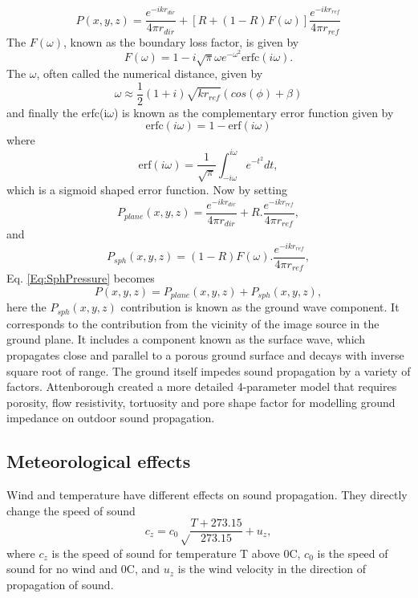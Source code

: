 \begin{equation}
    P(x,y,z)=\frac{e^{-ikr_{dir}}}{4\pi r_{dir}} + [R + (1-R)F(\omega)]\frac{e^{-ikr_{ref}}}{4\pi r_{ref}}
    \label{Eq:SphPressure}
\end{equation}
The $F(\omega)$, known as the boundary loss factor, is given by
\begin{equation}
    F(\omega)=1-i\sqrt{\pi}\omega e^{-\omega^2}\text{erfc}(i\omega).
\end{equation}
The $\omega$, often called the numerical distance, given by
\begin{equation}
    \omega \approx \frac{1}{2}(1+i)\sqrt{kr_{ref}}(cos(\phi)+\beta)
\end{equation}
and finally the erfc(i$\omega$) is known as the complementary error function given by 
\begin{equation}
    \text{erfc}(i\omega) = 1-\text{erf}(i\omega)
\end{equation}
where
\begin{equation}
    \text{erf}(i\omega)=\frac{1}{\sqrt\pi}\int_{-i\omega}^{i\omega}e^{-t^2}dt,
\end{equation}
which is a sigmoid shaped error function. Now by setting
\begin{equation}
    P_{plane}(x,y,z)=\frac{e^{-ikr_{dir}}}{4\pi r_{dir}} + R.\frac{e^{-ikr_{ref}}}{4\pi r_{ref}},
\end{equation}
and 
\begin{equation}
    P_{sph}(x,y,z)=(1-R)F(\omega).\frac{e^{-ikr_{ref}}}{4\pi r_{ref}},
\end{equation}
Eq. \ref{Eq:SphPressure} becomes
\begin{equation}
    P(x,y,z)=P_{plane}(x,y,z) + P_{sph}(x,y,z),
    \label{Eq:GroundWave}
\end{equation}
here the $P_{sph}(x,y,z)$ contribution is known as the ground wave component. It corresponds to the contribution from the vicinity of the image source in the ground plane. It includes a component known as the surface wave, which propagates close and parallel to a porous ground surface and decays with inverse square root of range.
The ground itself impedes sound propagation by a variety of factors. Attenborough \cite{attenborough2011outdoor} created a more detailed 4-parameter model that requires porosity, flow resistivity, tortuosity and pore shape factor for modelling ground impedance on outdoor sound propagation. 

\subsection{Meteorological effects}
Wind and temperature have different effects on sound propagation. They directly change the speed of sound
\begin{equation}
    c_z = c_0\sqrt\frac{T+273.15}{273.15} + u_z,
\end{equation}
where $c_z$ is the speed of sound for temperature T above 0\degree C, $c_0$ is the speed of sound for no wind and 0\degree C, and $u_z$ is the wind velocity in the direction of propagation of sound. 

